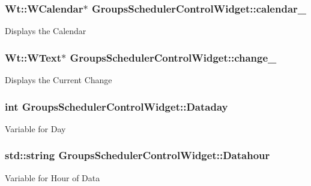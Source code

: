 \subsubsection[{\texorpdfstring{calendar\+\_\+}{calendar_}}]{\setlength{\rightskip}{0pt plus 5cm}Wt\+::\+W\+Calendar$\ast$ Groups\+Scheduler\+Control\+Widget\+::calendar\+\_\+\hspace{0.3cm}{\ttfamily [private]}}\hypertarget{classGroupsSchedulerControlWidget_af96ad1c81859c805e032e12b9c5df0bd}{}\label{classGroupsSchedulerControlWidget_af96ad1c81859c805e032e12b9c5df0bd}
Displays the Calendar 
\subsubsection[{\texorpdfstring{change\+\_\+}{change_}}]{\setlength{\rightskip}{0pt plus 5cm}Wt\+::\+W\+Text$\ast$ Groups\+Scheduler\+Control\+Widget\+::change\+\_\+\hspace{0.3cm}{\ttfamily [private]}}\hypertarget{classGroupsSchedulerControlWidget_a80ebbe0358716709bd4d2d5657a08538}{}\label{classGroupsSchedulerControlWidget_a80ebbe0358716709bd4d2d5657a08538}
Displays the Current Change 
\subsubsection[{\texorpdfstring{Dataday}{Dataday}}]{\setlength{\rightskip}{0pt plus 5cm}int Groups\+Scheduler\+Control\+Widget\+::\+Dataday\hspace{0.3cm}{\ttfamily [private]}}\hypertarget{classGroupsSchedulerControlWidget_a7c82db58f89050af2218d34e5b33cf8b}{}\label{classGroupsSchedulerControlWidget_a7c82db58f89050af2218d34e5b33cf8b}
Variable for Day 
\subsubsection[{\texorpdfstring{Datahour}{Datahour}}]{\setlength{\rightskip}{0pt plus 5cm}std\+::string Groups\+Scheduler\+Control\+Widget\+::\+Datahour\hspace{0.3cm}{\ttfamily [private]}}\hypertarget{classGroupsSchedulerControlWidget_adbc8d45964535dc6673cf09eecf85c39}{}\label{classGroupsSchedulerControlWidget_adbc8d45964535dc6673cf09eecf85c39}
Variable for Hour of Data 
